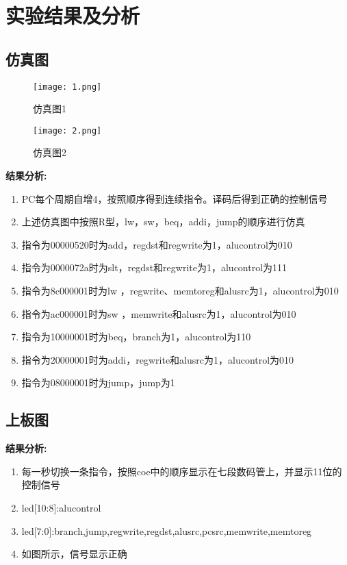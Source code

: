 \section{实验结果及分析}
\subsection{仿真图}

\begin{figure}[htbp]
    \centering
    \texttt{[image: 1.png]}
    \caption{仿真图1}
\end{figure}

\begin{figure}[htbp]
    \centering
    \texttt{[image: 2.png]}
    \caption{仿真图2}
\end{figure}

\textbf{结果分析: }
\begin{enumerate}
    \item PC每个周期自增4，按照顺序得到连续指令。译码后得到正确的控制信号
    \item 上述仿真图中按照R型，lw，sw，beq，addi，jump的顺序进行仿真
    \item 指令为00000520时为add，regdst和regwrite为1，alucontrol为010
    \item 指令为0000072a时为slt，regdst和regwrite为1，alucontrol为111
    \item 指令为8c000001时为lw ，regwrite、memtoreg和alusrc为1，alucontrol为010
    \item 指令为ac000001时为sw ，memwrite和alusrc为1，alucontrol为010
    \item 指令为10000001时为beq，branch为1，alucontrol为110
    \item 指令为20000001时为addi，regwrite和alusrc为1，alucontrol为010
    \item 指令为08000001时为jump，jump为1
\end{enumerate}

\subsection{上板图}

\textbf{结果分析: }
\begin{enumerate}
    \item 每一秒切换一条指令，按照coe中的顺序显示在七段数码管上，并显示11位的控制信号
    \item led[10:8]:alucontrol
    \item led[7:0]:{branch,jump,regwrite,regdst,alusrc,pcsrc,memwrite,memtoreg}
    \item 如图所示，信号显示正确
\end{enumerate}

